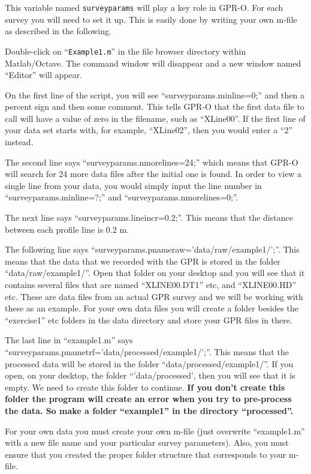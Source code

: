 \documentclass[11pt]{article}
\begin{document}
This variable named \verb#surveyparams# will play a key role in
GPR-O. For each survey you will need to set it up. This is easily
done by writing your own m-file as described in the following.

Double-click on ``\verb#Example1.m#'' in the file browser directory within Matlab/Octave. 
The command window will disappear and a new window named ``Editor'' will appear.

On the first line of the script, you will see ``surveyparams.minline=0;'' 
and then a percent sign and then some comment. This tells GPR-O that the 
first data file to call will have a value of zero in the filename, such as ``XLine00''.
If the first line of your data set starts with, for example, ``XLine02'',
then you would enter a ``2'' instead.

The second line says ``surveyparams.nmorelines=24;'' which means that
GPR-O will search for 24 more data files after the initial one is found.
In order to view a single line from your data, you would simply input
the line number in ``surveyparams.minline=?;'' and ``surveyparams.nmorelines=0;''.

The next line says ``surveyparams.lineincr=0.2;''. This means that the
distance between each profile line is 0.2 m.

The following line says
``surveyparams.pnameraw='data/raw/example1/';''. This means that the
data that we recorded with the GPR is stored in the folder
``data/raw/example1/''. Open that folder on your desktop and you will
see that it contains several files that are named ``XLINE00.DT1'' etc,
and ``XLINE00.HD'' etc. These are data files from an actual GPR survey 
and we will be working with these as an example. For your own data files 
you will create a folder besides the ``exercise1'' etc folders in the data 
directory and store your GPR files in there.

The last line in ``example1.m'' says
``surveyparams.pnametrf='data/processed/example1/';''. This means that
the processed data will be stored in the folder
``data/processed/example1/''. If you open, on your desktop, the folder
``'data/processed', then you will see that it is empty. We need to
create this folder to continue. \textbf{If you don't create this folder
  the program will create an error when you try to pre-process the
  data. So make a folder ``example1'' in the directory ``processed''.}

For your own data you must create your own m-file (just overwrite 
``example1.m'' with a new file name and your particular survey parameters).
Also, you must ensure that you created the proper folder structure 
that corresponds to your m-file.
\end{document}
